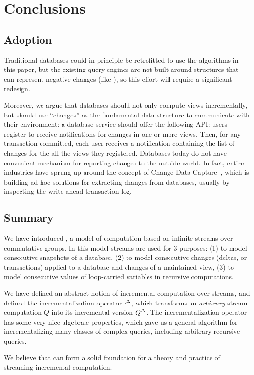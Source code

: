 \section{Conclusions}\label{sec:conclusions}%

\subsection{Adoption}

Traditional databases could in principle be retrofitted to use the
algorithms in this paper, but the existing query engines are not built
around structures that can represent negative changes (like \zrs), so
this effort will require a significant redesign.

Moreover, we argue that databases should not only compute views
incrementally, but should use ``changes'' as the fundamental data
structure to communicate with their environment: a database service
should offer the following API: users register to receive
notifications for changes in one or more views.  Then, for any
transaction committed, each user receives a notification containing
the list of changes for the all the views they registered.  Databases
today do not have convenient mechanism for reporting changes to the
outside world.  In fact, entire industries have sprung up around the
concept of Change Data Capture~\cite{cdc}, which is building ad-hoc
solutions for extracting changes from databases, usually by inspecting
the write-ahead transaction log.

\subsection{Summary}

We have introduced \dbsp, a model of computation based on infinite
streams over commutative groups.  In this model streams are used for 3
purposes: (1) to model consecutive snapshots of a database, (2) to
model consecutive changes (deltas, or transactions) applied to a
database and changes of a maintained view, (3) to model consecutive
values of loop-carried variables in recursive computations.

We have defined an abstract notion of incremental computation over
streams, and defined the incrementalization operator ${\cdot}^{\Delta}$,
which transforms an \emph{arbitrary} stream computation $Q$ into its
incremental version ${Q}^{\Delta}$.  The incrementalization operator has
some very nice algebraic properties, which gave us a general algorithm
for incrementalizing many classes of complex queries, including
arbitrary recursive queries.

We believe that \dbsp can form a solid foundation for a theory and
practice of streaming incremental computation.
